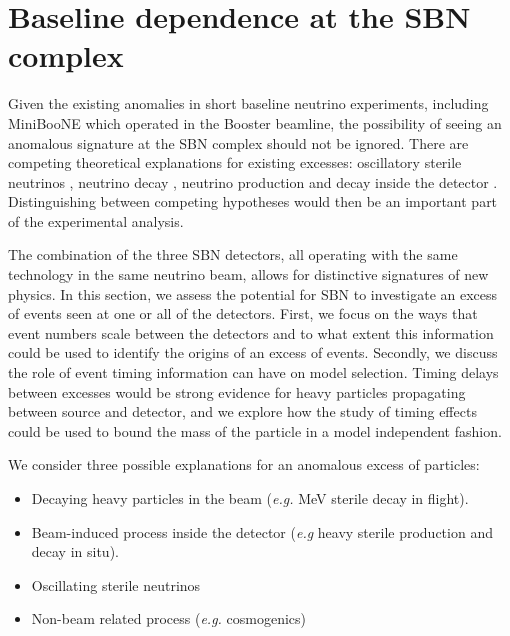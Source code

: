 \documentclass[11pt, a4paper]{article}
\begin{document}
\section{\label{sec:baselineinterplay}Baseline dependence at the SBN complex}

Given the existing anomalies in short baseline neutrino experiments, including
MiniBooNE which operated in the Booster beamline, the possibility of seeing an
anomalous signature at the SBN complex should not be ignored. There are
competing theoretical explanations for existing excesses: oscillatory sterile
neutrinos \cite{Everyone...}, neutrino decay \cite{PascoliSchwetz}, neutrino
production and decay inside the detector \cite{Gninenko/Meloni}. Distinguishing
between competing hypotheses would then be an important part of the
experimental analysis. 

The combination of the three SBN detectors, all operating with the same
technology in the same neutrino beam, allows for distinctive signatures of new
physics. In this section, we assess the potential for SBN to investigate an
excess of events seen at one or all of the detectors. 
%
%
%
First, we focus on the ways that event numbers scale between the detectors and
to what extent this information could be used to identify the origins of an
excess of events. Secondly, we discuss the role of event timing information can
have on model selection.  Timing delays between excesses would be strong
evidence for heavy particles propagating between source and detector, and we
explore how the study of timing effects could be used to bound the mass of the
particle in a model independent fashion.

We consider three possible explanations for an anomalous excess of particles:

\begin{itemize}
%
\item Decaying heavy particles in the beam (\emph{e.g.} MeV sterile decay in flight).
%
\item Beam-induced process inside the detector (\emph{e.g} heavy sterile production and decay in situ).
%
\item Oscillating sterile neutrinos
%
\item Non-beam related process (\emph{e.g.} cosmogenics)
%
\end{itemize}
\end{document}
